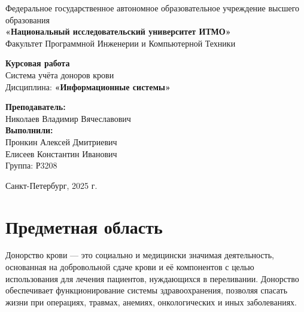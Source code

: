 \documentclass[a4paper,12pt]{article}
\begin{document}
\begin{titlepage}
  \centering
  
  {\small
  Федеральное государственное автономное образовательное учреждение высшего образования\\
  \textbf{«Национальный исследовательский университет ИТМО»}\\[1em]
  Факультет Программной Инженерии и Компьютерной Техники
  }
  
  \vspace{5cm}
  
  {\Large
  \textbf{Курсовая работа}\\[1em]
  Система учёта доноров крови\\[1em]
  Дисциплина:
  \textbf{«Информационные системы»}
  }
  
  \vspace{2cm}
  
  
  \vfill
  
  \begin{flushright}
  \textbf{Преподаватель:}\\
  Николаев Владимир Вячеславович\\[1em]
  \textbf{Выполнили:}\\
  Пронкин Алексей Дмитриевич\\
  Елисеев Константин Иванович\\
  Группа: Р3208
  \end{flushright}
  
  \vspace{1.5cm}
  
  Санкт-Петербург, 2025 г.
  
\end{titlepage}

\section*{Предметная область}

Донорство крови — это социально и медицински значимая деятельность, 
основанная на добровольной сдаче крови и её компонентов с целью использования
для лечения пациентов, нуждающихся в переливании. Донорство обеспечивает 
функционирование системы здравоохранения, позволяя спасать жизни при 
операциях, травмах, анемиях, онкологических и иных заболеваниях.
\end{document}
